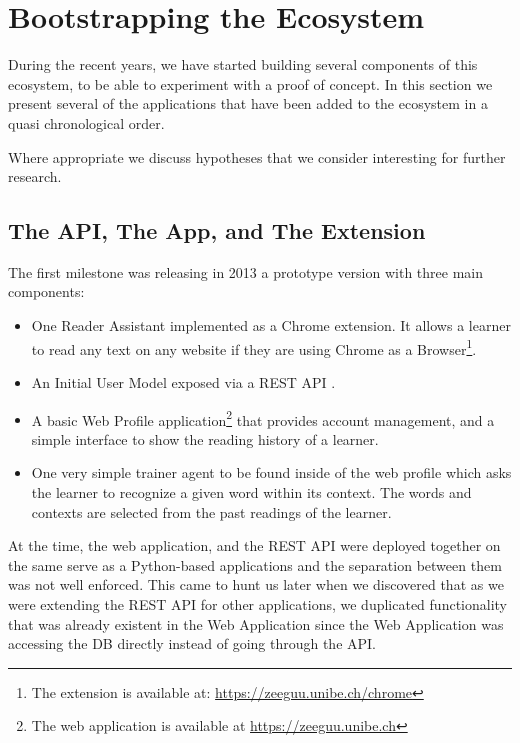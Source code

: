 

\section {Bootstrapping the Ecosystem}

During the recent years, we have started building several components of this ecosystem, to be able to experiment with a proof of concept. In this section we present several of the applications that have been added to the ecosystem in a quasi chronological order. 

Where appropriate we discuss hypotheses that we consider interesting for further research. 

\subsection {The API, The App, and The Extension}
The first milestone was releasing in 2013 a prototype version with three main components: 

\begin{itemize}
	\item One Reader Assistant implemented as a Chrome extension. It allows a learner to read any text on any website if they are using Chrome as a Browser\footnote{The extension is available at: \url{https://zeeguu.unibe.ch/chrome}}. 

	\item An Initial User Model exposed via a REST API  \cite{Lung16zeeguu}. 

	\item A basic Web Profile application\footnote{The web application is available at \url{https://zeeguu.unibe.ch}} that provides account management, and a simple interface to show the reading history of a learner. 

	\item One very simple trainer agent to be found inside of the web profile which asks the learner to recognize a given word within its context. The words and contexts are selected from the past readings of the learner.

\end{itemize}

At the time, the web application, and the REST API were deployed together on the same serve as a Python-based applications and the separation between them was not well enforced. This came to hunt us later when we discovered that as we were extending the REST API for other applications, we duplicated functionality that was already existent in the Web Application since the Web Application was accessing the DB directly instead of going through the API.

